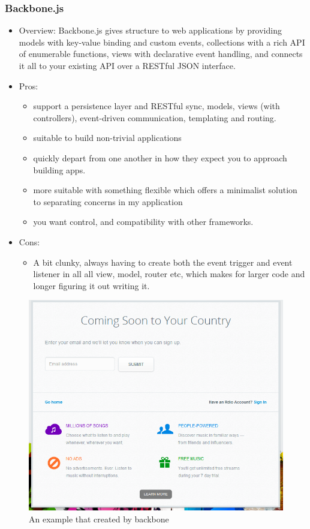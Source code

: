 \documentclass[14pt,a4paper]{extreport}
\begin{document}
			\subsubsection{Backbone.js}
			\begin{itemize}
				\item Overview: Backbone.js gives structure to web applications by providing models with key-value binding and custom events, collections with a rich API of enumerable functions, views with declarative event handling, and connects it all to your existing API over a RESTful JSON interface.
				\item Pros: 
					\begin{itemize}
						\item support a persistence layer and RESTful sync, models, views (with controllers), event-driven communication, templating and routing.
						\item suitable  to build non-trivial applications
						\item quickly depart from one another in how they expect you to approach building apps.
						\item more suitable with something flexible which offers a minimalist solution to separating concerns in my application
						\item you want control, and compatibility with other frameworks.
					\end{itemize}
				\item Cons:
					\begin{itemize}
						\item  A bit clunky, always having to create both the event trigger and event listener in all all view, model, router etc, which makes for larger code and longer figuring it out writing it.
					\end{itemize}
			\end{itemize}
			\begin{figure}
				\begin{center}
				\includegraphics[scale=0.9]{backbone.png}
				\caption{An example that created by backbone}
				\end{center}
			\end{figure}
\end{document}
